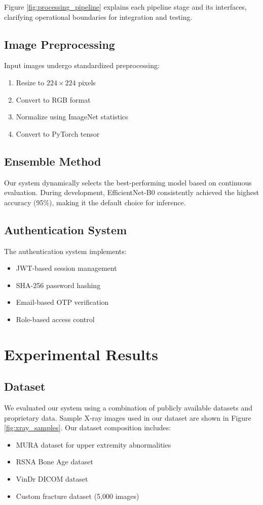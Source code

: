 \documentclass[conference]{IEEEtran}
\begin{document}
Figure \ref{fig:processing_pipeline} explains each pipeline stage and its interfaces, clarifying operational boundaries for integration and testing.

\subsection{Image Preprocessing}
Input images undergo standardized preprocessing:
\begin{enumerate}
    \item Resize to $224\times 224$ pixels
    \item Convert to RGB format
    \item Normalize using ImageNet statistics
    \item Convert to PyTorch tensor
\end{enumerate}

\subsection{Ensemble Method}
Our system dynamically selects the best-performing model based on continuous evaluation. During development, EfficientNet-B0 consistently achieved the highest accuracy (95\%), making it the default choice for inference.

\subsection{Authentication System}
The authentication system implements:
\begin{itemize}
    \item JWT-based session management
    \item SHA-256 password hashing
    \item Email-based OTP verification
    \item Role-based access control
\end{itemize}

\section{Experimental Results}
\label{sec:results}

\subsection{Dataset}
We evaluated our system using a combination of publicly available datasets and proprietary data. Sample X-ray images used in our dataset are shown in Figure \ref{fig:xray_samples}. Our dataset composition includes:
\begin{itemize}
    \item MURA dataset for upper extremity abnormalities
    \item RSNA Bone Age dataset
    \item VinDr DICOM dataset
    \item Custom fracture dataset (5,000 images)
\end{itemize}
\end{document}
